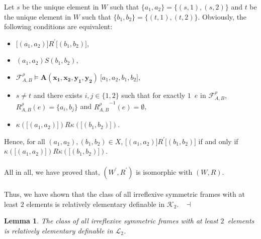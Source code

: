 \documentclass[draft]{article}
\newtheorem{lemma}{Lemma}
\newenvironment{proof}{{\bf Proof:}}{~$\dashv$\\}
\begin{document}
\begin{proof}
Let $s$ be the unique element in $W$ such that $\{a_{1},a_{2}\}{=}\{(s,1),(s,2)\}$ and $t$ be the unique element in $W$ such that $\{b_{1},b_{2}\}{=}\{(t,1),(t,2)\}$.
Obviously, the following conditions are equivalent:
%
%
\begin{itemize}
%
%
\item $\lbrack(a_{1},a_{2})\rbrack{R^{\prime}}\lbrack(b_{1},b_{2})\rbrack$,
%
%
\item $(a_{1},a_{2}){S}(b_{1},b_{2})$,
%
%
\item ${\mathcal F}^{\rho}_{A,B}{\models}\mathbf{A}(\mathbf{x_{1}},\mathbf{x_{2}},\mathbf{y_{1}},\mathbf{y_{2}})\ \lbrack a_{1},a_{2},b_{1},b_{2}\rbrack$,
%
%
\item $s{\not=}t$ and there exists $i,j{\in}\{1,2\}$ such that for exactly $1$~$e$ in ${\mathcal F}_{A,B}^{\rho}$, $R_{A,B}^{\rho}(e){=}
%
%
%
%
%
%
%
%
%
%
%
%
$\linebreak$
%
%
%
%
%
%
%
%
%
%
%
%
\{a_{i},b_{j}\}$ and ${R_{A,B}^{\rho}}^{{-}1}(e){=}\emptyset$,
%
%
\item $\kappa(\lbrack(a_{1},a_{2})\rbrack){R}\kappa(\lbrack(b_{1},b_{2})\rbrack)$.
%
%
\end{itemize}
%
%
Hence, for all $(a_{1},a_{2}),(b_{1},b_{2}){\in}X$, $\lbrack(a_{1},a_{2})\rbrack{R^{\prime}}\lbrack(b_{1},b_{2})\rbrack$ if and only if $\kappa(\lbrack(a_{1},a_{2})\rbrack){R}
%
%
%
%
%
%
%
%
%
%
%
%
$\linebreak$
%
%
%
%
%
%
%
%
%
%
%
%
\kappa(\lbrack(b_{1},b_{2})\rbrack)$.
%
%
\\
\\
%
%
All in all, we have proved that, $(W^{\prime},R^{\prime})$ is isomorphic with $(W,R)$.
%
%
\\
\\
%
%
Thus, we have shown that the class of all irreflexive symmetric frames with at least $2$ elements is relatively elementary definable in ${\mathcal K}_{2}$.
%
%
\medskip
%
%
\end{proof}
%
%
\begin{lemma}\label{lemma:relatively:elementary:definable:L2}
%
%
The class of all irreflexive symmetric frames with at least $2$~elements is relatively elementary definable in ${\mathcal L}_{2}$.
%
%
\end{lemma}
%
%
\end{document}
